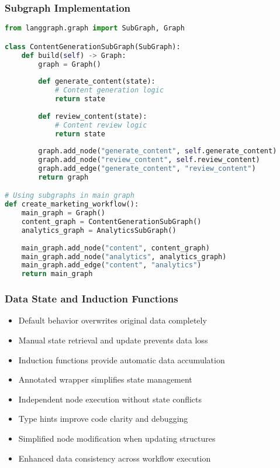 \begin{frame}[fragile]\frametitle{Subgraph Implementation}
      \begin{lstlisting}[language=Python, basicstyle=\tiny]
from langgraph.graph import SubGraph, Graph

class ContentGenerationSubGraph(SubGraph):
    def build(self) -> Graph:
        graph = Graph()
        
        def generate_content(state):
            # Content generation logic
            return state
            
        def review_content(state):
            # Content review logic
            return state
            
        graph.add_node("generate_content", self.generate_content)
        graph.add_node("review_content", self.review_content)
        graph.add_edge("generate_content", "review_content")
        return graph

# Using subgraphs in main graph
def create_marketing_workflow():
    main_graph = Graph()
    content_graph = ContentGenerationSubGraph()
    analytics_graph = AnalyticsSubGraph()
    
    main_graph.add_node("content", content_graph)
    main_graph.add_node("analytics", analytics_graph)
    main_graph.add_edge("content", "analytics")
    return main_graph
      \end{lstlisting}
\end{frame}

\begin{frame}[fragile]\frametitle{Data State and Induction Functions}
      \begin{itemize}
        \item Default behavior overwrites original data completely
        \item Manual state retrieval and update prevents data loss
        \item Induction functions provide automatic data accumulation
        \item Annotated wrapper simplifies state management
        \item Independent node execution without state conflicts
        \item Type hints improve code clarity and debugging
        \item Simplified node modification when updating structures
        \item Enhanced data consistency across workflow execution
      \end{itemize}
\end{frame}

